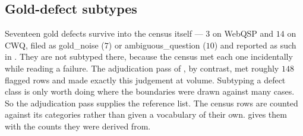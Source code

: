 \subsection*{Gold-defect subtypes}

Seventeen gold defects survive into the census itself --- $3$ on WebQSP and $14$
on CWQ, filed as \textsf{gold\_noise} ($7$) or \textsf{ambiguous\_question}
($10$) and reported as such in . They are not
subtyped there, because the census met each one incidentally while reading a
failure. The adjudication pass of , by contrast, met
roughly $148$ flagged rows and made exactly this judgement at volume.
Subtyping a defect class is only worth doing where the boundaries were drawn
against many cases. So the adjudication pass supplies the reference list. The
census rows are counted against its categories rather than given a vocabulary
of their own.
 gives them with the counts they were derived
from.


